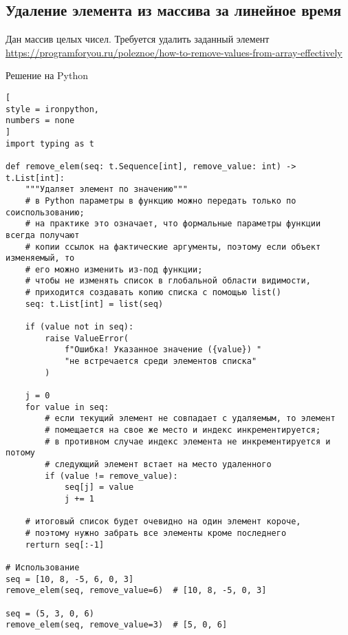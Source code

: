 \documentclass[%
	11pt,
	a4paper,
	utf8,
		]{article}
\begin{document}
\subsection{Удаление элемента из массива за линейное время}

Дан массив целых чисел. Требуется удалить заданный элемент \url{https://programforyou.ru/poleznoe/how-to-remove-values-from-array-effectively}

Решение на Python
\begin{lstlisting}[
style = ironpython,
numbers = none
]
import typing as t

def remove_elem(seq: t.Sequence[int], remove_value: int) -> t.List[int]:
    """Удаляет элемент по значению"""
    # в Python параметры в функцию можно передать только по соиспользованию;
    # на практике это означает, что формальные параметры функции всегда получают
    # копии ссылок на фактические аргументы, поэтому если объект изменяемый, то
    # его можно изменить из-под функции;
    # чтобы не изменять список в глобальной области видимости,
    # приходится создавать копию списка с помощью list()
    seq: t.List[int] = list(seq)
    
    if (value not in seq):
        raise ValueError(
            f"Ошибка! Указанное значение ({value}) "
            "не встречается среди элементов списка"
        )
        
    j = 0
    for value in seq:
        # если текущий элемент не совпадает с удаляемым, то элемент 
        # помещается на свое же место и индекс инкрементируется;
        # в противном случае индекс элемента не инкрементируется и потому
        # следующий элемент встает на место удаленного
        if (value != remove_value):
            seq[j] = value
            j += 1
    
    # итоговый список будет очевидно на один элемент короче,
    # поэтому нужно забрать все элементы кроме последнего
    rerturn seq[:-1]
        
# Использование
seq = [10, 8, -5, 6, 0, 3]
remove_elem(seq, remove_value=6)  # [10, 8, -5, 0, 3]

seq = (5, 3, 0, 6)
remove_elem(seq, remove_value=3)  # [5, 0, 6]
\end{lstlisting}




\begin{thebibliography}{99}
\end{thebibliography}


\lstlistoflistings{}
\end{document}
